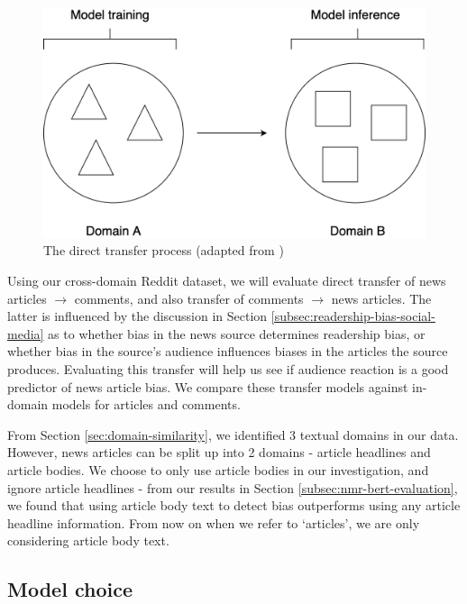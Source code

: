 \begin{figure}[ht]
    \centering
    \includegraphics[scale=0.25]{0-img/direct-transfer.png}
    \caption{The direct transfer process (adapted from \cite{ruder})}
    \label{fig:direct-transfer}
\end{figure}

Using our cross-domain Reddit dataset, we will evaluate direct transfer of news articles $ \rightarrow $ comments, and also transfer of comments $ \rightarrow $ news articles. The latter is influenced by the discussion in Section \ref{subsec:readership-bias-social-media} as to whether bias in the news source determines readership bias, or whether bias in the source's audience influences biases in the articles the source produces. Evaluating this transfer will help us see if audience reaction is a good predictor of news article bias. We compare these transfer models against in-domain models for articles and comments.

From Section \ref{sec:domain-similarity}, we identified 3 textual domains in our data. However, news articles can be split up into 2 domains - article headlines and article bodies. We choose to only use article bodies in our investigation, and ignore article headlines - from our results in Section \ref{subsec:nmr-bert-evaluation}, we found that using article body text to detect bias outperforms using any article headline information. From now on when we refer to `articles', we are only considering article body text.

\subsection{Model choice}

